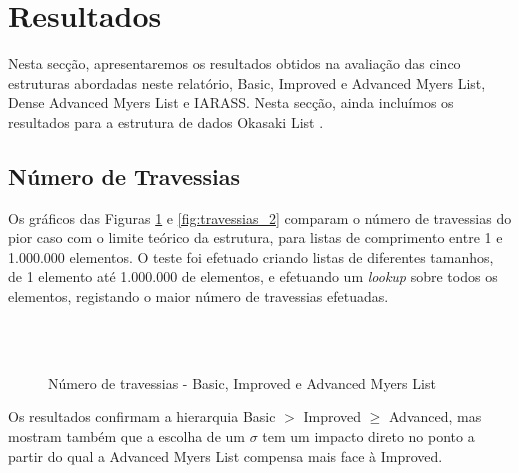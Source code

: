 \section{Resultados} \label{sec:resultados}

Nesta secção, apresentaremos os resultados obtidos na avaliação das cinco estruturas abordadas neste relatório, Basic, Improved e Advanced Myers List, Dense Advanced Myers List e IARASS. 
Nesta secção, ainda incluímos os resultados para a estrutura de dados Okasaki List \cite{okasaki1995}.

\subsection{Número de Travessias}


Os gráficos das Figuras \ref{fig:travessias_1} e \ref{fig:travessias_2} comparam o número de travessias do pior caso com o limite 
teórico da estrutura, para listas de comprimento entre 1 e 1.000.000 elementos. O teste foi efetuado criando listas de diferentes tamanhos,
de 1 elemento até 1.000.000 de elementos, e efetuando um \textit{lookup} sobre todos os elementos, registando o maior número de travessias efetuadas.

\begin{figure}[H]
    \centering
    
    \hfill
    \\
    
    \subfloat[Advanced Myers List ($\sigma$ = 2)]{
        
    }
    \hfill
    \subfloat[Advanced Myers List ($\sigma$ = 4)]{
        
    }
    \\
    
    \subfloat[Advanced Myers List ($\sigma$ = 8)]{
        
    }
    \hfill
    \subfloat[Advanced Myers List ($\sigma$ = 16)]{
        
    }
    
    \caption{Número de travessias - Basic, Improved e Advanced Myers List}
    \label{fig:travessias_1}
\end{figure}

Os resultados confirmam a hierarquia Basic $>$ Improved $\ge$ Advanced, mas mostram também que a escolha
de um $\sigma$ tem um impacto direto no ponto a partir do qual a Advanced Myers List compensa mais face 
à Improved. 


